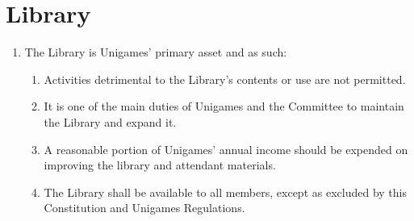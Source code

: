 \documentclass[a4paper]{article}
\begin{document}
\section{Library} \label{sec:library}
\begin{enumerate}
    \item The Library is Unigames' primary asset and as such:
          \begin{enumerate}
              \item Activities detrimental to the Library's contents or use are not permitted.
              \item It is one of the main duties of Unigames and the Committee to maintain the Library and expand it.
              \item A reasonable portion of Unigames' annual income should be expended on improving the library and attendant materials.
              \item The Library shall be available to all members, except as excluded by this Constitution and Unigames Regulations.
          \end{enumerate}
\end{enumerate}
\end{document}
